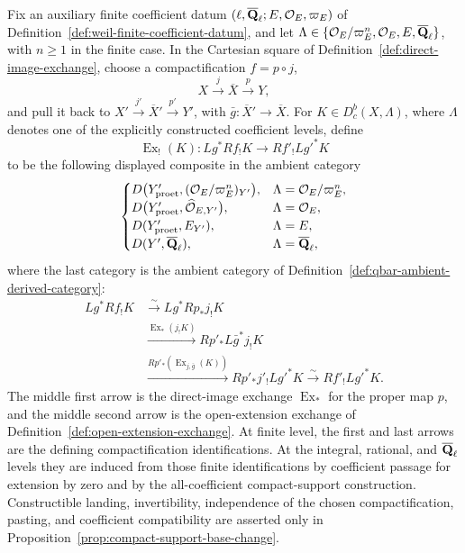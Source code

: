 \begin{definition}
\label{def:compact-support-exchange}


Fix an auxiliary finite coefficient datum
\((\ell,\overline{\mathbf Q}_\ell;E,\mathcal O_E,\varpi_E)\) of
Definition~\ref{def:weil-finite-coefficient-datum}, and let
\(\Lambda\in\{\mathcal O_E/\varpi_E^n,\mathcal O_E,E,\overline{\mathbf Q}_\ell\}\), with
\(n\geq1\) in the finite case.  In the Cartesian square of
Definition~\ref{def:direct-image-exchange}, choose
a compactification \(f=p\circ j\),
\[
 X\xrightarrow{j}\overline X\xrightarrow{p}Y,
\]
and pull it back to
\(X'\xrightarrow{j'}\overline X'\xrightarrow{p'}Y'\), with
\(\bar g:\overline X'\to\overline X\).  For
\(K\in D^b_c(X,\Lambda)\), where \(\Lambda\) denotes one of the explicitly
constructed coefficient levels, define
\[
 \operatorname{Ex}_!(K):Lg^*Rf_!K\longrightarrow Rf'_!Lg'^*K
\]
to be the following displayed composite in the ambient category
\[
 \begin{cases}
 D\bigl(Y'_{\mathrm{proet}},
   (\mathcal O_E/\varpi_E^n)_{Y'}\bigr),
   &\Lambda=\mathcal O_E/\varpi_E^n,\\
 D\bigl(Y'_{\mathrm{proet}},\widehat{\mathcal O}_{E,Y'}\bigr),
   &\Lambda=\mathcal O_E,\\
 D(Y'_{\mathrm{proet}},E_{Y'}),&\Lambda=E,\\
 D(Y',\overline{\mathbf Q}_\ell),&\Lambda=\overline{\mathbf Q}_\ell,
 \end{cases}
\]
where the last category is the ambient category of
Definition~\ref{def:qbar-ambient-derived-category}:
\[
\begin{aligned}
 Lg^*Rf_!K
 &\xrightarrow{\sim} Lg^*Rp_*j_!K\\
 &\xrightarrow{\operatorname{Ex}_*(j_!K)}
 Rp'_*L\bar g^*j_!K\\
 &\xrightarrow{Rp'_*(\operatorname{Ex}_{j,\bar g}(K))}
 Rp'_*j'_!Lg'^*K
 \xrightarrow{\sim}Rf'_!Lg'^*K.
\end{aligned}
\]
The middle first arrow is the direct-image exchange \(\operatorname{Ex}_*\)
for the proper map \(p\), and the middle second arrow is the open-extension
exchange of Definition~\ref{def:open-extension-exchange}.  At finite level,
the first and last arrows are the defining compactification identifications.
At the integral, rational, and \(\overline{\mathbf Q}_\ell\) levels they are induced from those
finite identifications by coefficient passage for extension by zero and by
the all-coefficient compact-support construction.  Constructible
landing, invertibility, independence of the chosen compactification,
pasting, and coefficient compatibility are asserted only in
Proposition~\ref{prop:compact-support-base-change}.
\end{definition}

